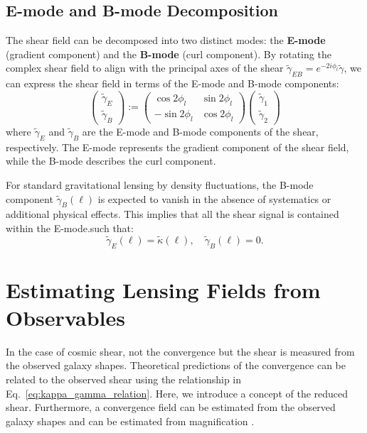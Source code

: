 \subsection{E-mode and B-mode Decomposition}
The shear field can be decomposed into two distinct modes: the \textbf{E-mode} (gradient component) and the \textbf{B-mode} (curl component). 
By rotating the complex shear field to align with the principal axes of the shear $\tilde{\gamma}_{EB} = e^{-2i\phi_l} \tilde{\gamma}$, we can express the shear field in terms of the E-mode and B-mode components:
\begin{equation}
    \begin{pmatrix}
        \tilde{\gamma}_E \\
        \tilde{\gamma}_B
        \end{pmatrix}
        :=
        \begin{pmatrix}
        \cos 2\phi_l & \sin 2\phi_l \\
        -\sin 2\phi_l & \cos 2\phi_l
        \end{pmatrix}
        \begin{pmatrix}
        \tilde{\gamma}_1 \\
        \tilde{\gamma}_2
    \end{pmatrix}
    \label{eq:EB_decomposition}
\end{equation}
where $\tilde{\gamma}_E$ and $\tilde{\gamma}_B$ are the E-mode and B-mode components of the shear, respectively. The E-mode represents the gradient component of the shear field, while the B-mode describes the curl component.

For standard gravitational lensing by density fluctuations, the B-mode component $\tilde{\gamma}_B(\boldsymbol{\ell})$ is expected to vanish in the absence of systematics or additional physical effects. This implies that all the shear signal is contained within the E-mode.such that:
\begin{equation}
    \tilde{\gamma}_E(\boldsymbol{\ell}) = \tilde{\kappa}(\boldsymbol{\ell}), \quad \tilde{\gamma}_B(\boldsymbol{\ell}) = 0.
    \label{eq:EB_decomposition_standard}
\end{equation}

\section[Lensing Estimation]{Estimating Lensing Fields from Observables}
In the case of cosmic shear, not the convergence but the shear is measured from the observed galaxy shapes. Theoretical predictions of the convergence can be related to the observed shear using the relationship in Eq.~\eqref{eq:kappa_gamma_relation}. 
Here, we introduce a concept of the reduced shear. Furthermore, a convergence field can be estimated from the observed galaxy shapes \citep{1993ApJ...404..441K} and can be estimated from magnification \citep{2001PhR...340..291B}.

